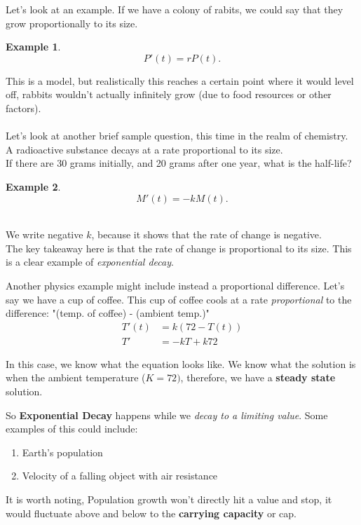 \documentclass[10pt, oneside]{report}
\newtheorem{exmp}{Example}
\begin{document}
Let's look at an example.  If we have a colony of rabits, we could say that they grow proportionally to its size.  
\begin{exmp}
\[
P'(t) = rP(t)
.\] 
\end{exmp}
This is a model, but realistically this reaches a certain point where it would level off, rabbits wouldn't actually infinitely grow (due to food resources or other factors).\\
\\
Let's look at another brief sample question, this time in the realm of chemistry.  \\
A radioactive substance decays at a rate proportional to its size.  \\
If there are 30 grams initially, and 20 grams after one year, what is the half-life?\\
\begin{exmp}
\[
M'(t) = -kM(t)
.\] 
\end{exmp}\\

We write negative $k$, because it shows that the rate of change is negative.  \\
The key takeaway here is that the rate of change is proportional to its size. This is a clear example of \textit{exponential decay}. 

Another physics example might include instead a proportional difference.  
Let's say we have a cup of coffee.  This cup of coffee cools at a rate \textit{proportional} to the difference: "(temp. of coffee) - (ambient temp.)"\\
\begin{align}
    T'(t) &= k(72 - T(t))\\
    T' &= -kT + k72
\end{align}

In this case, we know what the equation looks like.  We know what the solution is when the ambient temperature ($K=72)$, therefore, we have a \textbf{steady state} solution.  

So \textbf{Exponential Decay} happens while we \textit{decay to a limiting value}.  Some examples of this could include:
\begin{enumerate}
    \item Earth's population
    \item Velocity of a falling object with air resistance
\end{enumerate}

It is worth noting, Population growth won't directly hit a value and stop, it would fluctuate above and below to the \textbf{carrying capacity} or cap.
\end{document}
